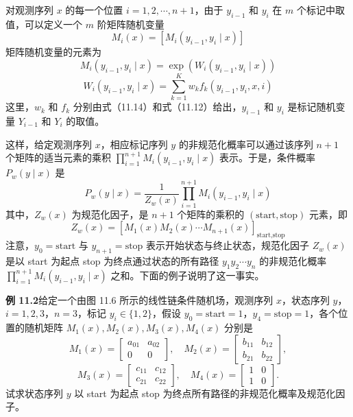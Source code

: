 \documentclass[UTF8,12pt,a4paper,fontset=fandol]{ctexart}
\begin{document}
对观测序列 $x$ 的每一个位置 $i=1,2,\cdots,n+1$，由于 $y_{i-1}$ 和 $y_i$ 在 $m$ 个标记中取值，可以定义一个 $m$ 阶矩阵随机变量
\begin{equation}
M_i(x)=[M_i(y_{i-1},y_i\mid x)]
\tag{11.21}
\end{equation}
矩阵随机变量的元素为
\begin{equation}
M_i(y_{i-1},y_i\mid x)=\exp(W_i(y_{i-1},y_i\mid x))
\tag{11.22}
\end{equation}
\begin{equation}
W_i(y_{i-1},y_i\mid x)=\sum_{k=1}^{K}w_k f_k(y_{i-1},y_i,x,i)
\tag{11.23}
\end{equation}
这里，$w_k$ 和 $f_k$ 分别由式（11.14）和式（11.12）给出，$y_{i-1}$ 和 $y_i$ 是标记随机变量 $Y_{i-1}$ 和 $Y_i$ 的取值。

这样，给定观测序列 $x$，相应标记序列 $y$ 的非规范化概率可以通过该序列 $n+1$ 个矩阵的适当元素的乘积 $\prod_{i=1}^{n+1}M_i(y_{i-1},y_i\mid x)$ 表示。于是，条件概率 $P_w(y\mid x)$ 是
\begin{equation}
P_w(y\mid x)=\frac{1}{Z_w(x)}\prod_{i=1}^{n+1}M_i(y_{i-1},y_i\mid x)
\tag{11.24}
\end{equation}
其中，$Z_w(x)$ 为规范化因子，是 $n+1$ 个矩阵的乘积的 $(\text{start},\text{stop})$ 元素，即
\begin{equation}
Z_w(x)=\left[M_1(x)M_2(x)\cdots M_{n+1}(x)\right]_{\text{start},\text{stop}}
\tag{11.25}
\end{equation}
注意，$y_0=\text{start}$ 与 $y_{n+1}=\text{stop}$ 表示开始状态与终止状态，规范化因子 $Z_w(x)$ 是以 start 为起点 stop 为终点通过状态的所有路径 $y_1y_2\cdots y_n$ 的非规范化概率 $\prod_{i=1}^{n+1}M_i(y_{i-1},y_i\mid x)$ 之和。下面的例子说明了这一事实。

\noindent\textbf{例 11.2}\quad 给定一个由图 11.6 所示的线性链条件随机场，观测序列 $x$，状态序列 $y$，$i=1,2,3$，$n=3$，标记 $y_i\in\{1,2\}$，假设 $y_0=\text{start}=1$，$y_4=\text{stop}=1$，各个位置的随机矩阵 $M_1(x),M_2(x),M_3(x),M_4(x)$ 分别是
\[
M_1(x)=
\begin{bmatrix}
a_{01} & a_{02}\\
0 & 0
\end{bmatrix},\quad
M_2(x)=
\begin{bmatrix}
b_{11} & b_{12}\\
b_{21} & b_{22}
\end{bmatrix},
\]
\[
M_3(x)=
\begin{bmatrix}
c_{11} & c_{12}\\
c_{21} & c_{22}
\end{bmatrix},\quad
M_4(x)=
\begin{bmatrix}
1 & 0\\
1 & 0
\end{bmatrix}.
\]
试求状态序列 $y$ 以 start 为起点 stop 为终点所有路径的非规范化概率及规范化因子。
\end{document}
